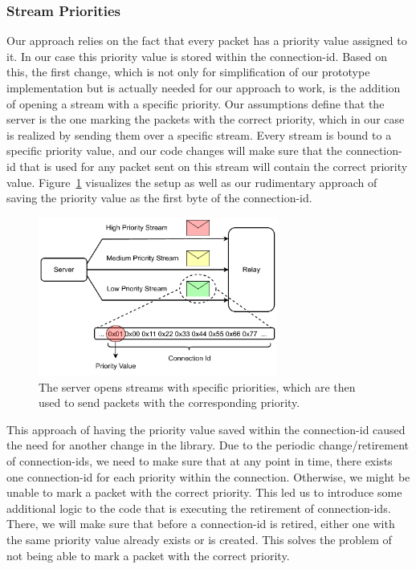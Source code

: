 \subsubsection*{Stream Priorities}
Our approach relies on the fact that every packet has a priority value assigned to it.
In our case this priority value is stored within the connection-id.
Based on this, the first change, which is not only for simplification of our prototype implementation but is actually needed for 
our approach to work, is the addition of opening a stream with a specific priority.
Our assumptions define that the server is the one marking the packets with the correct priority, which in 
our case is realized by sending them over a specific stream.
Every stream is bound to a specific priority value, and our code changes will make sure that the connection-id
that is used for any packet sent on this stream will contain the correct priority value.
Figure~\ref{fig:priority-stream} visualizes the setup as well as our rudimentary approach of saving the 
priority value as the first byte of the connection-id.

\vspace{0.5cm}
\begin{figure}[H]
    \centering
    \includegraphics[width=0.7\textwidth]{figures/03_fast_relays/priority-streams.drawio.pdf}
    \caption[Streams with specific priorities]{The server opens streams with specific priorities, 
    which are then used to send packets with the corresponding priority.}\label{fig:priority-stream}
\end{figure}

This approach of having the priority value saved within the connection-id caused the need for another 
change in the library.
Due to the periodic change/retirement of connection-ids, we need to make sure that at any point in time, there 
exists one connection-id for each priority within the connection.
Otherwise, we might be unable to mark a packet with the correct priority.
This led us to introduce some additional logic to the code that is executing the retirement of connection-ids.
There, we will make sure that before a connection-id is retired, either one with the same priority value
already exists or is created.
This solves the problem of not being able to mark a packet with the correct priority.

